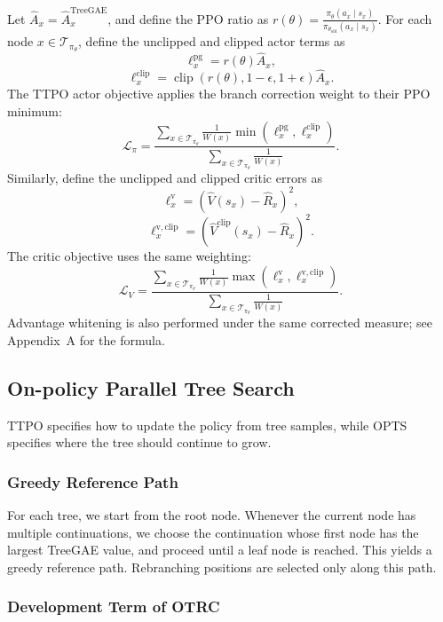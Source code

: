 Let $\hat A_x=\hat A^{\mathrm{TreeGAE}}_x$, and define the PPO ratio as $r(\theta)=\frac{\pi_\theta(a_x\mid s_x)}{\pi_{\theta_{\mathrm{old}}}(a_x\mid s_x)}$. For each node $x\in\mathcal{T}_{\pi_\theta}$, define the unclipped and clipped actor terms as
\[
\ell_x^{\mathrm{pg}}
=
r(\theta)\hat A_x,
\]
\[
\ell_x^{\mathrm{clip}}
=
\operatorname{clip}(r(\theta),1-\epsilon,1+\epsilon)\hat A_x.
\]
The TTPO actor objective applies the branch correction weight to their PPO minimum:
\begin{equation}
\label{eq:ttpo-actor}
\mathcal{L}_{\pi}
=
\frac{
\sum_{x\in\mathcal{T}_{\pi_\theta}}\frac{1}{W(x)}
\min\!\left(\ell_x^{\mathrm{pg}},\ell_x^{\mathrm{clip}}\right)
}{
\sum_{x\in\mathcal{T}_{\pi_\theta}}\frac{1}{W(x)}
}.
\end{equation}
Similarly, define the unclipped and clipped critic errors as
\[
\ell_x^{\mathrm{v}}
=
(\hat V(s_x)-\hat R_x)^2,
\]
\[
\ell_x^{\mathrm{v,clip}}
=
(\hat V^{\mathrm{clip}}(s_x)-\hat R_x)^2.
\]
The critic objective uses the same weighting:
\begin{equation}
\label{eq:ttpo-critic}
\mathcal{L}_{V}
=
\frac{
\sum_{x\in\mathcal{T}_{\pi_\theta}}\frac{1}{W(x)}
\max\!\left(\ell_x^{\mathrm{v}},\ell_x^{\mathrm{v,clip}}\right)
}{
\sum_{x\in\mathcal{T}_{\pi_\theta}}\frac{1}{W(x)}
}.
\end{equation}
Advantage whitening is also performed under the same corrected measure; see Appendix~A for the formula.

\subsection{On-policy Parallel Tree Search}

TTPO specifies how to update the policy from tree samples, while OPTS specifies where the tree should continue to grow.

\subsubsection{Greedy Reference Path}

For each tree, we start from the root node. Whenever the current node has multiple continuations, we choose the continuation whose first node has the largest TreeGAE value, and proceed until a leaf node is reached. This yields a greedy reference path. Rebranching positions are selected only along this path.

\subsubsection{Development Term of OTRC}

